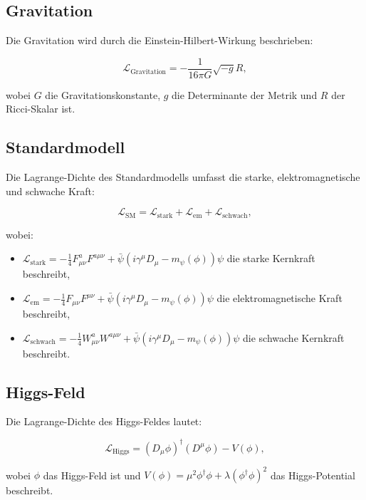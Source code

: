 \documentclass{article}
\begin{document}
	\subsection{Gravitation}
	Die Gravitation wird durch die Einstein-Hilbert-Wirkung beschrieben:
	
	\begin{equation}
		\mathcal{L}_\text{Gravitation} = -\frac{1}{16\pi G} \sqrt{-g} R,
	\end{equation}
	
	wobei $G$ die Gravitationskonstante, $g$ die Determinante der Metrik und $R$ der Ricci-Skalar ist.
	
	\subsection{Standardmodell}
	Die Lagrange-Dichte des Standardmodells umfasst die starke, elektromagnetische und schwache Kraft:
	
	\begin{equation}
		\mathcal{L}_\text{SM} = \mathcal{L}_\text{stark} + \mathcal{L}_\text{em} + \mathcal{L}_\text{schwach},
	\end{equation}
	
	wobei:
	\begin{itemize}
		\item $\mathcal{L}_\text{stark} = -\frac{1}{4} F_{\mu\nu}^a F^{a\mu\nu} + \bar{\psi}(i \gamma^\mu D_\mu - m_\psi(\phi))\psi$ die starke Kernkraft beschreibt,
		\item $\mathcal{L}_\text{em} = -\frac{1}{4} F_{\mu\nu} F^{\mu\nu} + \bar{\psi}(i \gamma^\mu D_\mu - m_\psi(\phi))\psi$ die elektromagnetische Kraft beschreibt,
		\item $\mathcal{L}_\text{schwach} = -\frac{1}{4} W_{\mu\nu}^a W^{a\mu\nu} + \bar{\psi}(i \gamma^\mu D_\mu - m_\psi(\phi))\psi$ die schwache Kernkraft beschreibt.
	\end{itemize}
	
	\subsection{Higgs-Feld}
	Die Lagrange-Dichte des Higgs-Feldes lautet:
	
	\begin{equation}
		\mathcal{L}_\text{Higgs} = (D_\mu \phi)^\dagger (D^\mu \phi) - V(\phi),
	\end{equation}
	
	wobei $\phi$ das Higgs-Feld ist und $V(\phi) = \mu^2 \phi^\dagger \phi + \lambda (\phi^\dagger \phi)^2$ das Higgs-Potential beschreibt.
	
\end{document}
